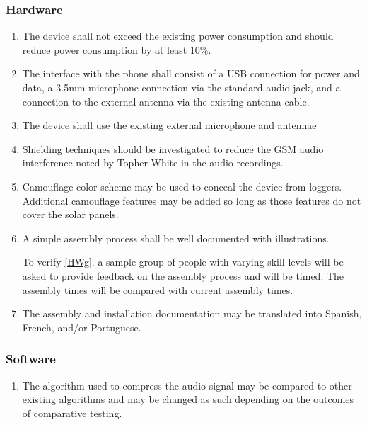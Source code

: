 \documentclass{article}
\numberwithin{figure}{section}
\numberwithin{equation}{section}
\begin{document}
{\subsubsection{Hardware} \label{sect:hardware1}
\begin{enumerate}[align=left,leftmargin=*, labelindent= 0em, label=\textbf{Requirement \thesubsubsection.\arabic*.}, itemindent=0em]

\item \label{HWa} The device shall not exceed the existing power consumption and should reduce power consumption by at least 10\%.
\item \label{HWb} The interface with the phone shall consist of a USB connection for power and data, a 3.5mm microphone connection via the standard audio jack, and a connection to the external antenna via the existing antenna cable.
\item \label{HWc}The device shall use the existing external microphone and antennae
\item \label{HWd} Shielding techniques should be investigated to reduce the GSM audio interference noted by Topher White in the audio recordings.
\item \label{HWf} Camouflage color scheme may be used to conceal the device from loggers.  Additional camouflage features may be added so long as those features do not cover the solar panels.
\item \label{HWg} A simple assembly process shall be well documented with illustrations.

\baselinestretch
To verify \ref{HWg}. a sample group of people with varying skill levels will be asked to provide feedback on the assembly process and will be timed. The assembly times will be compared with current assembly times.

\item \label{HWh} The assembly and installation documentation may be translated into Spanish, French, and/or Portuguese.
\end{enumerate}
\subsubsection{Software} \label{sect:software1}
\begin{enumerate}[align=left,leftmargin=*, labelindent= 0em, label=\textbf{Requirement \thesubsubsection.\arabic*.}, itemindent=0em]
\item \label{SWa} The algorithm used to compress the audio signal may be compared to other existing algorithms and may be changed as such depending on the outcomes of comparative testing.


\end{enumerate}}
\end{document}
